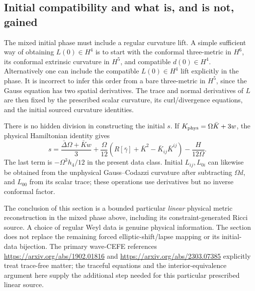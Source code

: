 \subsection{Initial compatibility and what is, and is not, gained}

The mixed initial phase must include a regular curvature lift.  A simple
sufficient way of obtaining $L(0)\in H^4$ is to start with the conformal
three-metric in $H^6$, its conformal extrinsic curvature in $H^5$, and
compatible $d(0)\in H^4$.  Alternatively one can include the compatible
$L(0)\in H^4$ lift explicitly in the phase.  It is incorrect to infer this
order from a bare three-metric in $H^5$, since the Gauss equation has two
spatial derivatives.  The trace and normal derivatives of $L$ are then
fixed by the prescribed scalar curvature, its curl/divergence equations,
and the initial sourced curvature identities.

There is no hidden division in constructing the initial $s$.  If
$K_{\rm phys}=\Omega\bar K+3w$, the physical Hamiltonian identity gives
\[
 s=\frac{\bar\Delta\Omega+\bar K w}{3}
 +\frac{\Omega}{12}
 (R[\bar\gamma]+\bar K^2-\bar K_{ij}\bar K^{ij})
 -\frac{H}{12\Omega}.
\]
The last term is $-\Omega^3h_4/12$ in the present data class.  Initial
$L_{ij},L_{0i}$ can likewise be obtained from the unphysical Gauss--Codazzi
curvature after subtracting $\Omega d$, and $L_{00}$ from its scalar trace;
these operations use derivatives but no inverse conformal factor.

The conclusion of this section is a bounded particular \emph{linear}
physical metric reconstruction in the mixed phase above, including its
constraint-generated Ricci source.  A choice of regular Weyl data is genuine
physical information.  The section does not replace the remaining forced
elliptic-shift/lapse mapping or its initial-data bijection.  The primary
wave-CEFE references
\url{https://arxiv.org/abs/1902.01816} and
\url{https://arxiv.org/abs/2303.07385} explicitly treat trace-free matter;
the traceful equations and the interior-equivalence argument here supply
the additional step needed for this particular prescribed linear source.
